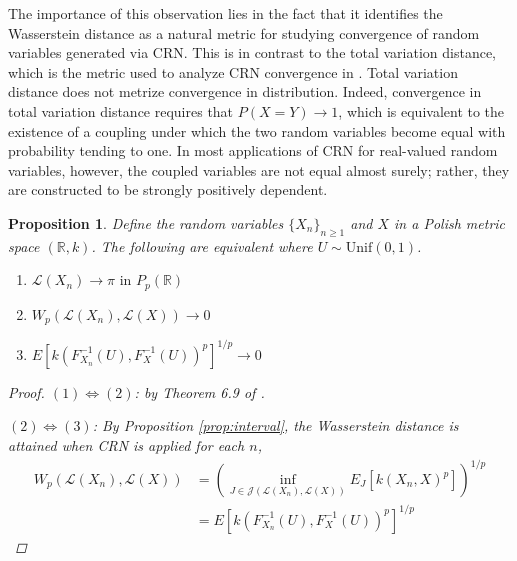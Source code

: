 \documentclass[12pt]{article}
\theoremstyle{plain}%
\newtheorem{prop}[theorem]{Proposition}
\theoremstyle{definition}
\def\unif{\mathrm{Unif}}
\begin{document}
The importance of this observation lies in the fact that it identifies the Wasserstein distance as a natural metric for studying convergence of random variables generated via CRN. This is in contrast to the total variation distance, which is the metric used to analyze CRN convergence in \cite{crnconv,independentmetropolishastings}. Total variation distance does not metrize convergence in distribution. Indeed, convergence in total variation distance requires that $P(X=Y)\to 1$, which is equivalent to the existence of a coupling under which the two random variables become equal with probability tending to one. In most applications of CRN for real-valued random variables, however, the coupled variables are not equal almost surely; rather, they are constructed to be strongly positively dependent.
\begin{prop}\label{thm:equivinv}
	Define the random variables $\{X_n\}_{n\geq 1}$ and $X$ in a Polish metric space $(\mathbb{R},k)$.%
	The following are equivalent where $U\sim \unif(0,1)$.
	\begin{enumerate}
		\item $\mathcal{L}(X_n)\to \pi \text{ in } P_p(\mathbb{R})$
		\item $W_{p}(\mathcal{L}(X_n), \mathcal{L}(X))\to 0$
		\item $E[k(F^{-1}_{X_n}(U),F^{-1}_{X}(U))^p]^{1/p}\to 0$
	\end{enumerate}
	
	\begin{proof}
		
		$(1)\iff (2)$: by Theorem 6.9 of \cite{villani}.
		
		$(2)\iff (3)$: By Proposition \ref{prop:interval}, the Wasserstein distance is attained when CRN is applied for each $n$,
		\begin{align*}
			W_p(\mathcal{L}(X_n), \mathcal{L}(X))&=\left(\inf_{J\in \mathcal{J}(\mathcal{L}(X_n), \mathcal{L}(X))} E_J[k(X_n,X)^p] \right)^{1/p}\\
			&=E[k(F^{-1}_{X_n}(U),F^{-1}_{X}(U))^p]^{1/p}
		\end{align*} %
	\end{proof}
\end{prop}
\end{document}

